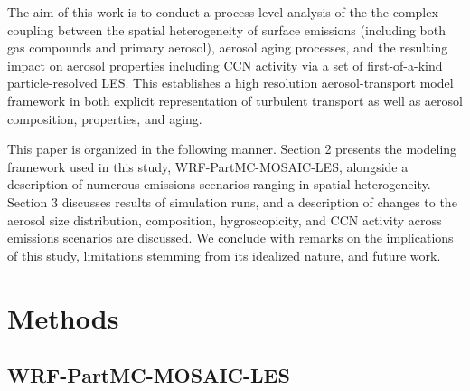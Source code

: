 \documentclass[journal abbreviation, manuscript]{copernicus}
\begin{document}

The aim of this work is to conduct a process-level analysis of the the complex coupling between the spatial heterogeneity of surface emissions (including both gas compounds and primary aerosol), aerosol aging processes, and the resulting impact on aerosol properties including CCN activity via a set of first-of-a-kind particle-resolved LES. This establishes a high resolution aerosol-transport model framework in both explicit representation of turbulent transport as well as aerosol composition, properties, and aging.

This paper is organized in the following manner. Section 2 presents the modeling framework used in this study, WRF-PartMC-MOSAIC-LES, alongside a description of numerous emissions scenarios ranging in spatial heterogeneity. Section 3 discusses results of simulation runs, and a description of changes to the aerosol size distribution, composition, hygroscopicity, and CCN activity across emissions scenarios are discussed. We conclude with remarks on the implications of this study, limitations stemming from its idealized nature, and future work. 



\section{Methods}

\subsection{WRF-PartMC-MOSAIC-LES}
\end{document}
